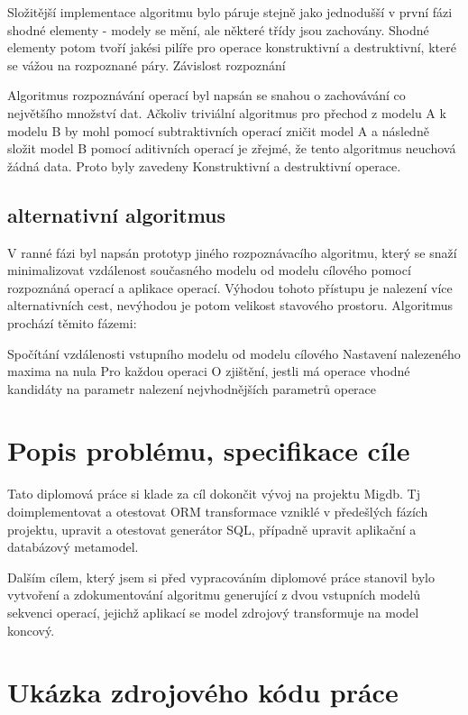 \documentclass[11pt,twoside,a4paper]{book}
\begin{document}
 Složitější implementace algoritmu bylo páruje stejně jako jednodušší v
 první fázi shodné elementy - modely se mění, ale některé třídy jsou zachovány.
Shodné elementy potom tvoří jakési pilíře pro operace konstruktivní a
destruktivní, které se vážou na rozpoznané páry. Závislost rozpoznání

Algoritmus rozpoznávání operací byl napsán se snahou o zachovávání co největšího
množství dat. Ačkoliv triviální algoritmus pro přechod z modelu A k modelu B by
mohl pomocí subtraktivních operací zničit model A a následně složit model B
pomocí aditivních operací je zřejmé, že tento algoritmus neuchová žádná data.
Proto byly zavedeny Konstruktivní a destruktivní operace. 

\section{alternativní algoritmus}

V ranné fázi byl napsán prototyp jiného rozpoznávacího algoritmu, který se snaží 
minimalizovat vzdálenost současného modelu od modelu cílového pomocí rozpoznáná 
operací a aplikace operací. Výhodou tohoto přístupu je nalezení více alternativních 
cest, nevýhodou je potom velikost stavového prostoru. Algoritmus prochází těmito fázemi:

Spočítání vzdálenosti vstupního modelu od modelu cílového
Nastavení nalezeného maxima na nula
Pro každou operaci O
     zjištění, jestli má operace vhodné kandidáty na parametr
     nalezení nejvhodnějších parametrů operace



\chapter{Popis problému, specifikace cíle}
Tato diplomová práce si klade za cíl dokončit vývoj na projektu Migdb. Tj
doimplementovat a otestovat ORM transformace vzniklé v předešlých fázích
projektu, upravit a otestovat generátor SQL, případně upravit aplikační a
databázový metamodel.

Dalším cílem, který jsem si před vypracováním diplomové práce stanovil bylo
vytvoření a zdokumentování algoritmu generující z dvou vstupních modelů
sekvenci operací, jejichž aplikací se model zdrojový transformuje na model
koncový.


\chapter{Ukázka zdrojového kódu práce}
\end{document}
